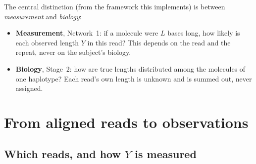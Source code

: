 \documentclass[10pt,a4paper]{article}
\begin{document}
The central distinction (from the framework this implements) is between \emph{measurement} and \emph{biology}:
\begin{itemize}
\item \textbf{Measurement}, Network~1: if a molecule were $L$ bases long, how likely is each observed length $Y$ in
this read? This depends on the read and the repeat, never on the subject's biology.
\item \textbf{Biology}, Stage~2: how are true lengths distributed among the molecules of one haplotype? Each read's
own length is unknown and is summed out, never assigned.
\end{itemize}

\section{From aligned reads to observations}

\subsection{Which reads, and how $Y$ is measured}
\end{document}
